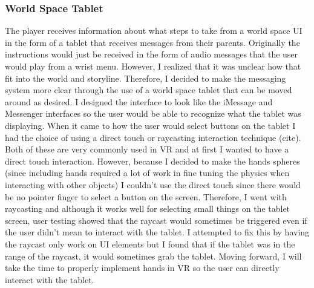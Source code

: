 \documentclass[10pt,twocolumn]{article}
\begin{document}
\subsubsection{World Space Tablet}
The player receives information about what steps to take from a world space UI in the form of a tablet that receives messages from their parents. Originally the instructions would just be received in the form of audio messages that the user would play from a wrist menu. However, I realized that it was unclear how that fit into the world and storyline. Therefore, I decided to make the messaging system more clear through the use of a world space tablet that can be moved around as desired. I designed the interface to look like the iMessage and Messenger interfaces so the user would be able to recognize what the tablet was displaying. When it came to how the user would select buttons on the tablet I had the choice of using a direct touch or raycasting interaction technique (cite). Both of these are very commonly used in VR and at first I wanted to have a direct touch interaction. However, because I decided to make the hands spheres (since including hands required a lot of work in fine tuning the physics when interacting with other objects) I couldn’t use the direct touch since there would be no pointer finger to select a button on the screen. Therefore, I went with raycasting and although it works well for selecting small things on the tablet screen, user testing showed that the raycast would sometimes be triggered even if the user didn’t mean to interact with the tablet. I attempted to fix this by having the raycast only work on UI elements but I found that if the tablet was in the range of the raycast, it would sometimes grab the tablet. Moving forward, I will take the time to properly implement hands in VR so the user can directly interact with the tablet.
 
\end{document}
